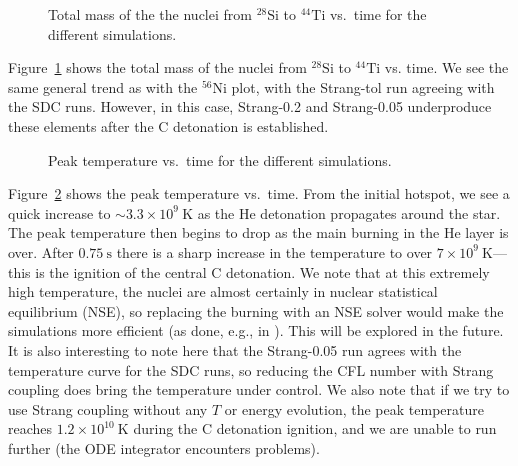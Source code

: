 \documentclass[preprint,linenumbers]{aastex631}
\newcommand{\isot}[2]{$^{#2}\mathrm{#1}$}
\newcommand{\MarginPar}[1]{
    \marginpar{\vskip-\baselineskip%
               \raggedright%
               \tiny\sffamily%
               {\color{red}\hrule%
               \smallskip%
               #1\par%
               \smallskip%
               \hrule}}%
}
\begin{document}
\begin{figure}
\centering
{}
\caption{\label{fig:subch_intermediate} Total mass of the
the nuclei from \isot{Si}{28} to \isot{Ti}{44} vs.\ time for the different simulations.}
\end{figure}

Figure~\ref{fig:subch_intermediate} shows the total mass 
of the nuclei from \isot{Si}{28} to \isot{Ti}{44} vs. time.  We see the same general trend as with the \isot{Ni}{56} plot, with the Strang-tol run agreeing with the SDC runs.  However, in this case, Strang-0.2 and Strang-0.05 underproduce these elements after the C detonation is established.

\begin{figure}
\centering
{}
\caption{\label{fig:subch_temp} Peak temperature vs.\ time
for the different simulations.}
\end{figure}

Figure~\ref{fig:subch_temp} shows the peak temperature vs.\ time.  From the initial hotspot, we see a quick increase to $\sim 3.3\times 10^9~\mathrm{K}$ as the He detonation propagates around the star.  The peak temperature then
begins to drop as the main burning in the He layer is over.  After $0.75~\mathrm{s}$ there is a sharp increase in the temperature to over $7\times 10^9~\mathrm{K}$---this is the ignition of the central C detonation.  We note that at this extremely high temperature, the nuclei are almost certainly in nuclear statistical equilibrium (NSE), so replacing the burning with an NSE solver would make the simulations more efficient (as done, e.g., in \citealt{ma:2013,kushnirkatz:2020}).  This will be explored in the future.  It is also interesting to
note here that the Strang-0.05 run agrees with the temperature curve for the SDC runs, so reducing the CFL number with Strang coupling does bring the temperature under control.  We also note that if 
we try to use Strang coupling without any $T$ or energy evolution, the peak temperature reaches $1.2\times 10^{10}~\mathrm{K}$ during the C detonation ignition,
and we are unable to run further (the ODE integrator encounters problems).


\end{document}
